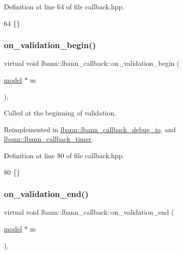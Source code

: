 Definition at line 64 of file callback.\+hpp.


\begin{DoxyCode}
64 \{\}
\end{DoxyCode}
\mbox{\label{classlbann_1_1lbann__callback_a2bde303671110519388d9962bc3e5583}} 
\subsubsection{\texorpdfstring{on\+\_\+validation\+\_\+begin()}{on\_validation\_begin()}}
{\footnotesize\ttfamily virtual void lbann\+::lbann\+\_\+callback\+::on\+\_\+validation\+\_\+begin (\begin{DoxyParamCaption}\item[{\hyperlink{classlbann_1_1model}{model} $\ast$}]{m }\end{DoxyParamCaption})\hspace{0.3cm}{\ttfamily [inline]}, {\ttfamily [virtual]}}

Called at the beginning of validation. 

Reimplemented in \hyperlink{classlbann_1_1lbann__callback__debug__io_ac26d9c113c1345cc1d6390141e1a894b}{lbann\+::lbann\+\_\+callback\+\_\+debug\+\_\+io}, and \hyperlink{classlbann_1_1lbann__callback__timer_aa86c0ae1b6fbc878b6ba9a4551b803b8}{lbann\+::lbann\+\_\+callback\+\_\+timer}.



Definition at line 80 of file callback.\+hpp.


\begin{DoxyCode}
80 \{\}
\end{DoxyCode}
\mbox{\label{classlbann_1_1lbann__callback_adc16e42e5064dc2dc8d84dfbfc1325eb}} 
\subsubsection{\texorpdfstring{on\+\_\+validation\+\_\+end()}{on\_validation\_end()}}
{\footnotesize\ttfamily virtual void lbann\+::lbann\+\_\+callback\+::on\+\_\+validation\+\_\+end (\begin{DoxyParamCaption}\item[{\hyperlink{classlbann_1_1model}{model} $\ast$}]{m }\end{DoxyParamCaption})\hspace{0.3cm}{\ttfamily [inline]}, {\ttfamily [virtual]}}

